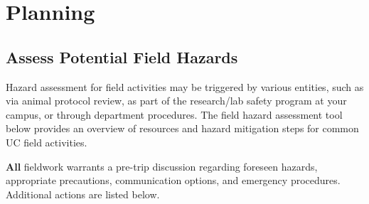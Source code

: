 \documentclass[
]{book}
\begin{document}
\hypertarget{planning}{%
\chapter{Planning}\label{planning}}

\hypertarget{assess-potential-field-hazards}{%
\section{Assess Potential Field Hazards}\label{assess-potential-field-hazards}}

Hazard assessment for field activities may be triggered by various entities, such as via animal protocol review, as part of the research/lab safety program at your campus, or through department procedures. The field hazard assessment tool below provides an overview of resources and hazard mitigation steps for common UC field activities.

\textbf{All} fieldwork warrants a pre-trip discussion regarding foreseen hazards, appropriate precautions, communication options, and emergency procedures. Additional actions are listed below.
\end{document}
